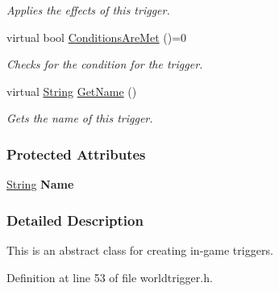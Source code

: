 \begin{DoxyCompactItemize}
\begin{DoxyCompactList}\small\item\em Applies the effects of this trigger. \item\end{DoxyCompactList}\item 
virtual bool \hyperlink{classMezzanine_1_1WorldTrigger_ae7a24ce175086bcd6e77f10d14c84b34}{ConditionsAreMet} ()=0
\begin{DoxyCompactList}\small\item\em Checks for the condition for the trigger. \item\end{DoxyCompactList}\item 
virtual \hyperlink{namespaceMezzanine_acf9fcc130e6ebf08e3d8491aebcf1c86}{String} \hyperlink{classMezzanine_1_1WorldTrigger_a20303907a5b0a0873951a24de5ee4c00}{GetName} ()
\begin{DoxyCompactList}\small\item\em Gets the name of this trigger. \item\end{DoxyCompactList}\end{DoxyCompactItemize}
\subsubsection*{Protected Attributes}
\begin{DoxyCompactItemize}
\item 
\hypertarget{classMezzanine_1_1WorldTrigger_a2fed5d67dcef203c169c3b3d3c795368}{
\hyperlink{namespaceMezzanine_acf9fcc130e6ebf08e3d8491aebcf1c86}{String} {\bfseries Name}}
\label{classMezzanine_1_1WorldTrigger_a2fed5d67dcef203c169c3b3d3c795368}

\end{DoxyCompactItemize}


\subsubsection{Detailed Description}
This is an abstract class for creating in-\/game triggers. 

Definition at line 53 of file worldtrigger.h.



